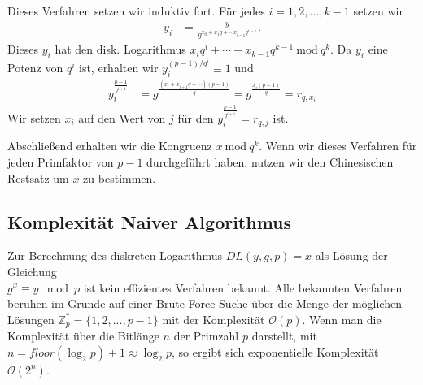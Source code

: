 \documentclass[
  a4paper,
  11pt,
]{scrartcl}
\theoremstyle{plain}
\theoremstyle{definition}
\theoremstyle{remark}
\newcommand{\Z}{\mathbb{Z}}
\newcommand{\Mod}[1]{\ \mathrm{mod}\ #1}
\begin{document}
Dieses Verfahren setzen wir induktiv fort. Für jedes $i = 1, 2, \ldots, k-1$
setzen wir
\begin{align*}
  y_i & = \frac{y}{g^{x_0 + x_1 q + \cdots x_{i-1} q^{i-1}}}.
\end{align*}
Dieses $y_i$ hat den disk. Logarithmus
$x_i q^i + \cdots + x_{k-1} q^{k-1} \Mod{q^k}$. Da $y_i$ eine Potenz von $q^i$
ist, erhalten wir $y_i^{(p-1)/q^i} \equiv 1$ und
\begin{align*}
  y_i^{\frac{p-1}{q^{i+1}}} &
    = g^{\frac{(x_i + x_{i+1} q + \cdots) (p-1)}{q}}
    = g^{\frac{x_i (p-1)}{q}}
    = r_{q, x_i}
\end{align*}
Wir setzen $x_i$ auf den Wert von $j$ für den
$y_i^{\frac{p-1}{q^{i+1}}} = r_{q, j}$ ist.

Abschließend erhalten wir die Kongruenz $x \Mod{q^k}$. Wenn wir dieses Verfahren
für jeden Primfaktor von $p-1$ durchgeführt haben, nutzen wir den Chinesischen
Restsatz um $x$ zu bestimmen.


\subsection{Komplexität Naiver Algorithmus}
\label{sub:komplexitaet_naiver_algorithmus}

Zur Berechnung des diskreten Logarithmus $DL(y,g,p) = x$ als Lösung der Gleichung \\
$g^x \equiv y \mod p$ ist kein effizientes Verfahren bekannt. Alle bekannten Verfahren beruhen im Grunde auf einer Brute-Force-Suche über die Menge der möglichen Lösungen $\Z_p^* = \{1, 2, ..., p-1\}$ mit der Komplexität $\mathcal O(p)$.
Wenn man die Komplexität über die Bitlänge $n$ der Primzahl $p$ darstellt, mit $n = floor( \log_2 p ) + 1 \approx \log_2 p$, so ergibt sich exponentielle Komplexität $\mathcal O(2^n)$.
\end{document}
